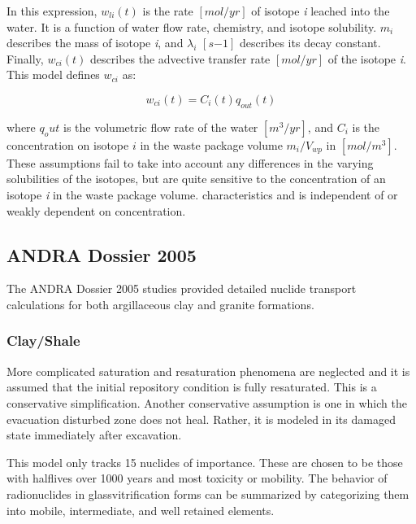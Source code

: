 In this expression, $w_{li}(t)$ is the rate $[mol/yr]$ of isotope \emph{i}
leached into the water.  It is a function of water flow rate, chemistry, and
isotope solubility. $m_i$ describes the mass of isotope \emph{i}, and
$\lambda_i$ $[s{-1}]$ describes its decay constant. Finally, $w_{ci}(t)$
describes the advective transfer rate $[mol/yr]$ of the isotope \emph{i}. This 
model defines $w_{ci}$ as:

\begin{equation}
  w_{ci}(t)=C_i(t)q_{out}(t) 
\end{equation}

where $q_out$ is the volumetric flow rate of the water $[m^3/yr]$, and 
$C_i$ is the concentration on isotope $i$ in the waste package volume 
$m_i/V_{wp}$ in $[mol/m^3]$. These assumptions fail to take into account any
differences in the varying solubilities of the isotopes, but are quite
sensitive to the concentration of an isotope \emph{i} in the waste package
volume.  
characteristics and is independent of or weakly dependent on concentration.  

\subsection{ANDRA Dossier 2005} The ANDRA Dossier 2005 studies provided
detailed nuclide transport calculations for both argillaceous clay and granite
formations.

\subsubsection{Clay/Shale} More complicated saturation and resaturation phenomena 
are neglected and it is assumed that the initial repository condition is fully
resaturated. This is a conservative simplification. Another conservative
assumption is one in which the evacuation disturbed zone does not heal. Rather,
it is modeled in its damaged state immediately after excavation. 

This model only tracks 15 nuclides of importance.  These are chosen to be those
with halflives over 1000 years and most toxicity or mobility.
\cite{andra_argile:_2005} The behavior of radionuclides in 
glassvitrification forms can be summarized by categorizing them into mobile,
intermediate, and well retained elements. 



